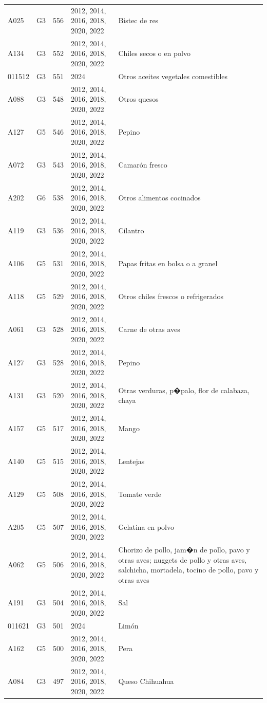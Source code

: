 \begin{table}[ht]
\begin{tabular}{llrll}
  A025 & G3 & 556 & 2012, 2014, 2016, 2018, 2020, 2022 & Bistec de res \\ 
  A134 & G3 & 552 & 2012, 2014, 2016, 2018, 2020, 2022 & Chiles secos o en polvo \\ 
  011512 & G3 & 551 & 2024 & Otros aceites vegetales comestibles \\ 
  A088 & G3 & 548 & 2012, 2014, 2016, 2018, 2020, 2022 & Otros quesos \\ 
  A127 & G5 & 546 & 2012, 2014, 2016, 2018, 2020, 2022 & Pepino \\ 
  A072 & G3 & 543 & 2012, 2014, 2016, 2018, 2020, 2022 & Camarón fresco \\ 
  A202 & G6 & 538 & 2012, 2014, 2016, 2018, 2020, 2022 & Otros alimentos cocinados \\ 
  A119 & G3 & 536 & 2012, 2014, 2016, 2018, 2020, 2022 & Cilantro \\ 
  A106 & G5 & 531 & 2012, 2014, 2016, 2018, 2020, 2022 & Papas fritas en bolsa o a granel \\ 
  A118 & G5 & 529 & 2012, 2014, 2016, 2018, 2020, 2022 & Otros chiles frescos o refrigerados \\ 
  A061 & G3 & 528 & 2012, 2014, 2016, 2018, 2020, 2022 & Carne de otras aves \\ 
  A127 & G3 & 528 & 2012, 2014, 2016, 2018, 2020, 2022 & Pepino \\ 
  A131 & G3 & 520 & 2012, 2014, 2016, 2018, 2020, 2022 & Otras verduras, p�palo, flor de calabaza, chaya \\ 
  A157 & G5 & 517 & 2012, 2014, 2016, 2018, 2020, 2022 & Mango \\ 
  A140 & G5 & 515 & 2012, 2014, 2016, 2018, 2020, 2022 & Lentejas \\ 
  A129 & G5 & 508 & 2012, 2014, 2016, 2018, 2020, 2022 & Tomate verde \\ 
  A205 & G5 & 507 & 2012, 2014, 2016, 2018, 2020, 2022 & Gelatina en polvo \\ 
  A062 & G5 & 506 & 2012, 2014, 2016, 2018, 2020, 2022 & Chorizo de pollo, jam�n de pollo, pavo y otras aves; nuggets de pollo y otras aves, salchicha, mortadela, tocino de pollo, pavo y otras aves \\ 
  A191 & G3 & 504 & 2012, 2014, 2016, 2018, 2020, 2022 & Sal \\ 
  011621 & G3 & 501 & 2024 & Limón \\ 
  A162 & G5 & 500 & 2012, 2014, 2016, 2018, 2020, 2022 & Pera \\ 
  A084 & G3 & 497 & 2012, 2014, 2016, 2018, 2020, 2022 & Queso Chihuahua \\ 

\end{tabular}
\end{table}
